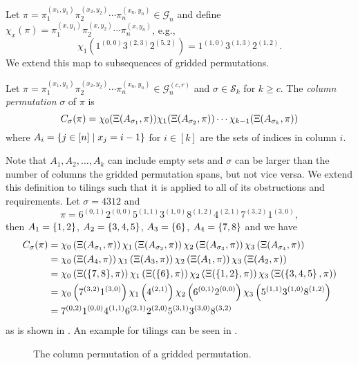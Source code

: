 Let $\pi=\pi_1^{(x_1,y_1)}\pi_2^{(x_2,y_2)}\dotsm\pi_n^{(x_n,y_n)} \in \mathcal{G}_n$ and define $\chi_x(\pi) = \pi_1^{(x,y_1)}\pi_2^{(x,y_2)}\dotsm\pi_n^{(x,y_n)}$, e.g.,
\[
\chi_{1}\left(1^{(0,0)}3^{(2,3)}2^{(5,2)}\right) = 1^{(1,0)}3^{(1,3)}2^{(1,2)}.
\]
We extend this map to subsequences of gridded permutations.

\begin{definition}
Let $\pi = \pi_1^{(x_1,y_1)}\pi_2^{(x_2,y_2)}\dotsm\pi_n^{(x_n,y_n)} \in \mathcal{G}_n^{(c,r)}$ and $\sigma \in \mathcal{S}_k$ for $k \geq c$. The \emph{column permutation} $\sigma$ of $\pi$ is 
\[
    C_\sigma(\pi) = \chi_0(\Xi(A_{\sigma_1},\pi))\chi_1(\Xi(A_{\sigma_2},\pi)) \dotsm \chi_{k-1}(\Xi(A_{\sigma_k},\pi))
\]
where $A_i = \left\{j \in [n] \mid x_j = i - 1\right\}$ for $i \in [k]$ are the sets of indices in column $i$.
\end{definition}

Note that $A_1,A_2,\dotsc,A_k$ can include empty sets and $\sigma$ can be larger than the number of columns the gridded permutation spans, but not vice versa. We extend this definition to tilings such that it is applied to all of its obstructions and requirements. Let $\sigma = 4312$ and
\[
\pi = 6^{(0,1)}2^{(0,0)}5^{(1,1)}3^{(1,0)}8^{(1,2)}4^{(2,1)}7^{(3,2)}1^{(3,0)},
\]
then $A_1=\left\{1,2\right\}$, $A_2=\left\{3,4,5\right\}$, $A_3=\left\{6\right\}$, $A_4=\left\{7,8\right\}$ and we have
\begin{align*}
    C_\sigma(\pi) &= \chi_0\left(\Xi(A_{\sigma_1},\pi)\right)\chi_1\left(\Xi(A_{\sigma_2},\pi)\right)\chi_2\left(\Xi(A_{\sigma_3},\pi)\right) \chi_3\left(\Xi(A_{\sigma_{4}},\pi)\right) \\
    &= \chi_0\left(\Xi(A_{4},\pi)\right)\chi_1\left(\Xi(A_{3},\pi)\right)\chi_2\left(\Xi(A_{1},\pi)\right)\chi_3\left(\Xi(A_{2},\pi)\right) \\
    &= \chi_0\left(\Xi({\left\{7,8\right\}},\pi)\right) \chi_1\left(\Xi({\left\{6\right\}},\pi)\right)\chi_2\left(\Xi({\left\{1,2\right\}},\pi)\right)\chi_3\left(\Xi(\left\{3,4,5\right\},\pi)\right) \\
    &= \chi_0\left(7^{(3,2)}1^{(3,0)}\right)\chi_1\left(4^{(2,1)}\right)\chi_2\left(6^{(0,1)}2^{(0,0)}\right)\chi_3\left(5^{(1,1)}3^{(1,0)}8^{(1,2)}\right) \\
    &= 7^{(0,2)}1^{(0,0)}4^{(1,1)}6^{(2,1)}2^{(2,0)}5^{(3,1)}3^{(3,0)}8^{(3,2)}
\end{align*}
as is shown in . An example for tilings can be seen in .

\begin{figure}[H]
    \centering
    
    \caption{The column permutation of a gridded permutation.}
    \label{fig:gp_col_perm}
\end{figure}

